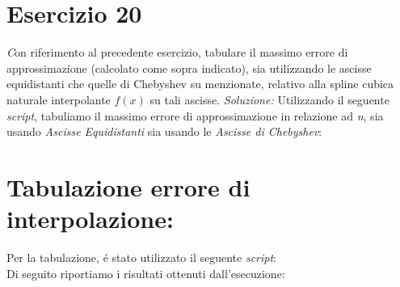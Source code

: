 \section{Esercizio 20}

\textit
Con riferimento al precedente esercizio, tabulare il massimo errore di approssimazione (calcolato come sopra indicato), sia utilizzando le ascisse equidistanti che quelle di Chebyshev su menzionate, relativo alla spline cubica naturale interpolante $f(x)$ su tali ascisse.
\newline
\noindent\emph{Soluzione: }\newline
Utilizzando il seguente \emph{script}, tabuliamo il massimo errore di approssimazione in relazione ad \emph{n}, sia usando \emph{Ascisse Equidistanti} sia usando le \emph{Ascisse di Chebyshev}:
\section*{Tabulazione errore di interpolazione:}

\newpage
Per la tabulazione, \'e stato utilizzato il seguente \emph{script}:\\

Di seguito riportiamo i risultati ottenuti dall'esecuzione:\\ \\
